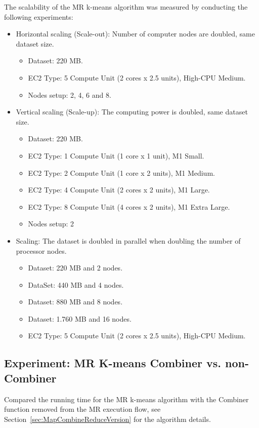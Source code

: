 The scalability of the MR k-means algorithm was measured by conducting the following experiments:
\begin{itemize}
	\item Horizontal scaling (Scale-out): Number of computer nodes are doubled, same dataset size.
	\begin{itemize}
		\item Dataset: 220 MB.
		\item EC2 Type: 5 Compute Unit (2 cores x 2.5 units), High-CPU Medium.
		\item Nodes setup: 2, 4, 6 and 8.
	\end{itemize}
	\item Vertical scaling (Scale-up): The computing power is doubled, same dataset size.
	\begin{itemize}
		\item Dataset: 220 MB.
		\item EC2 Type: 1 Compute Unit (1 core x 1 unit),  M1 Small.
		\item EC2 Type: 2 Compute Unit (1 core x 2 units), M1 Medium.
		\item EC2 Type: 4 Compute Unit (2 cores x 2 units), M1 Large.
		\item EC2 Type: 8 Compute Unit (4 cores x 2 units), M1 Extra Large.
		\item Nodes setup: 2
	\end{itemize}
	\item Scaling: The dataset is doubled in parallel when doubling the number of processor nodes.
	\begin{itemize}
		\item Dataset: 220 MB and 2 nodes.
		\item DataSet: 440 MB and 4 nodes.
		\item Dataset: 880 MB and 8 nodes.
		\item Dataset: 1.760 MB and 16 nodes.
		\item EC2 Type: 5 Compute Unit (2 cores x 2.5 units), High-CPU Medium.
	\end{itemize}
\end{itemize}

\subsection{Experiment: MR K-means Combiner vs. non-Combiner}
Compared the running time for the MR k-means algorithm with the Combiner function removed from the MR execution flow, see Section~\ref{sec:MapCombineReduceVersion} for the algorithm details.

